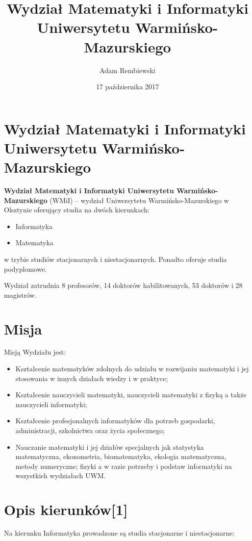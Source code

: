 \documentclass[a4paper,12pt]{article}
\title{Wydział Matematyki i Informatyki Uniwersytetu
Warmińsko-Mazurskiego}
\author{Adam Rembiewski}
\date{17 października 2017}
\begin{document}
\maketitle



\section{Wydział Matematyki i Informatyki Uniwersytetu Warmińsko-Mazurskiego}
\textbf{Wydział Matematyki i Informatyki Uniwersytetu Warmińsko-Mazurskiego} (WMiI) – wydział
Uniwersytetu Warmińsko-Mazurskiego w Olsztynie oferujący studia na dwóch kierunkach:
\begin{itemize} \itemsep1pt \parskip0pt 
\item Informatyka
\item Matematyka
\end{itemize}
w trybie studiów stacjonarnych i niestacjonarnych. Ponadto oferuje studia podyplomowe.


Wydział zatrudnia 8 profesorów, 14 doktorów habilitowanych, 53 doktorów i 28 magistrów.

\section{Misja}

Misją Wydziału jest:
\begin{itemize} \itemsep1pt \parskip0pt 
\item Kształcenie matematyków zdolnych do udziału w rozwijaniu matematyki i jej stosowania w innych działach wiedzy i w praktyce;
\item Kształcenie nauczycieli matematyki, nauczycieli matematyki z fizyką a także nauczycieli informatyki;
\item Kształcenie profesjonalnych informatyków dla potrzeb gospodarki, administracji, szkolnictwa oraz życia społecznego;
\item Nauczanie matematyki i jej działów specjalnych jak statystyka matematyczna, ekonometria,
biomatematyka, ekologia matematyczna, metody numeryczne; fizyki a w razie potrzeby i podstaw
informatyki na wszystkich wydziałach UWM.
\end{itemize}
\section{Opis kierunków[1]}
Na kierunku Informatyka prowadzone są studia stacjonarne i niestacjonarne:
\end{document}
